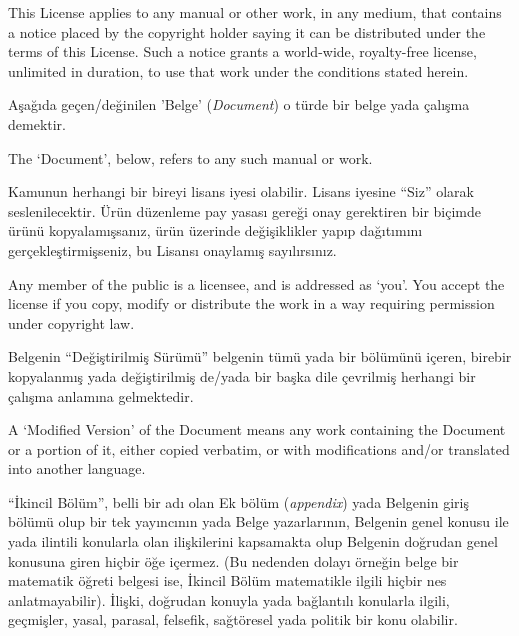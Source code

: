 \begin{multicols}{2}
\begin{ingliz}
This License applies to any manual or other
work, in any medium, that contains a notice placed by the
copyright holder saying it can be distributed under the terms
of this License.  Such a notice grants a world-wide,
royalty-free license, unlimited in duration, to use that work
under the conditions stated herein.
\end{ingliz}

Aşağıda geçen/değinilen 'Belge' (\emph{Document}) o türde bir belge yada çalışma demektir.

\begin{ingliz}
The `Document', below, refers to any such manual or work.
\end{ingliz}

Kamunun herhangi bir bireyi lisans iyesi olabilir. Lisans iyesine “Siz” olarak seslenilecektir. Ürün düzenleme pay yasası gereği onay gerektiren bir biçimde ürünü kopyalamışsanız, ürün üzerinde değişiklikler yapıp dağıtımını gerçekleştirmişseniz, bu Lisansı onaylamış sayılırsınız.

\begin{ingliz}
Any member of the public is a licensee, and is
addressed as `you'.  You accept the license if
you copy, modify or distribute the work in a way requiring
permission under copyright law.
\end{ingliz}


\label{gfdl-mod-ver}%

Belgenin ``Değiştirilmiş Sürümü'' belgenin tümü yada bir bölümünü içeren, birebir kopyalanmış yada değiştirilmiş de/yada bir başka dile çevrilmiş herhangi bir çalışma anlamına gelmektedir.

\begin{ingliz}
A `Modified Version' of the
Document means any work containing the Document or a portion
of it, either copied verbatim, or with modifications and/or
translated into another language.
\end{ingliz}


\label{gfdl-secnd-sect}%
“İkincil Bölüm”, belli bir adı olan Ek bölüm (\emph{appendix}) yada Belgenin giriş bölümü olup bir tek yayıncının yada Belge yazarlarının, Belgenin genel konusu ile yada ilintili konularla olan ilişkilerini kapsamakta olup Belgenin doğrudan genel konusuna giren hiçbir öğe içermez. (Bu nedenden dolayı örneğin belge bir matematik öğreti belgesi ise, İkincil Bölüm matematikle ilgili hiçbir nes anlatmayabilir). İlişki, doğrudan konuyla yada bağlantılı konularla ilgili, geçmişler, yasal, parasal, felsefik, sağtöresel yada politik bir konu olabilir.


\end{multicols}
